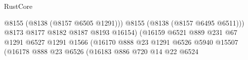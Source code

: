 \begin{lexlean}{RustCore}
\begin{coremodule}
                                                                    @8155
                                                                    (@8138 (@8157 @6505 @1291)))
                                                                  @8155
                                                                  (@8138 (@8157 @6495 @6511)))
                                                                @8173
                                                                @8177
                                                                @8182
                                                                @8187
                                                                @8193
                                                                @16154)
                                                              (@16159
                                                                @6521
                                                                @889
                                                                @231
                                                                @67
                                                                @1291
                                                                @6527
                                                                @1291
                                                                @1566
                                                                (@16170
                                                                  @888
                                                                  @23
                                                                  @1291
                                                                  @6526
                                                                  @5940
                                                                  @15507
                                                                  (@16178
                                                                    @888
                                                                    @23
                                                                    @6526
                                                                    (@16183
                                                                      @886
                                                                      @720
                                                                      @14
                                                                      @22
                                                                      @6524

\end{coremodule}
\end{lexlean}

